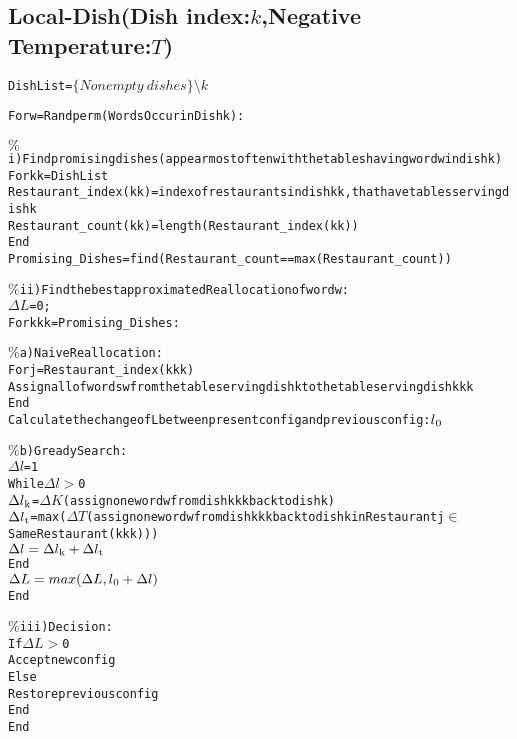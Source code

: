 \documentclass{article}
\begin{document}
\subsection{Local-Dish(Dish index:$k$,Negative Temperature:$T$)}
\begin{alltt}
Dish List=\(\{Nonempty \ dishes\}\setminus k\)

For w=Randperm(Words Occur in Dish k):
    
    \(\%\)i) Find promising dishes(appear most often with the tables having word w in dish k)
    For kk=Dish List
        Restaurant_index(kk)=index of restaurants in dish kk, that have tables serving dish k       
        Restaurant_count(kk)=length(Restaurant_index(kk))
    End 
    Promising_Dishes=find(Restaurant_count==max(Restaurant_count))

    \(\%\)ii) Find the best approximated Reallocation of word w:
    \(\Delta L\)=0; 
    For kkk=Promising_Dishes: 
	
         \(\%\)a)Naive Reallocation:	
        For j=Restaurant_index(kkk)
            Assign all of words w from the table serving dish k to the table serving dish kkk
        End
        Calculate the change of L between present config and previous config:\(l\textsubscript{0}\)
	
        \(\%\)b)Gready Search:
        \(\Delta l\)=1
        While \(\Delta l>\)0
              \(\Delta l\textsubscript{k}\)=\(\Delta K\)(assign one word w from dish kkk back to dish k)
              \(\Delta l\textsubscript{t}\)=max(\(\Delta T\)(assign one word w from dish kkk back to dish k in Restaurant j\(\in\)Same Restaurant(kkk)))
              \(\Delta l=\Delta l\textsubscript{k}+\Delta l\textsubscript{t}\)
        End
        \(\Delta L=max(\Delta L,l\textsubscript{0}+\Delta l)\)
    End 

    \(\%\)iii)Decision:
    If \(\Delta L>\)0
        Accept new config
    Else
        Restore previous config
    End 
End 
\end{alltt}
\end{document}
